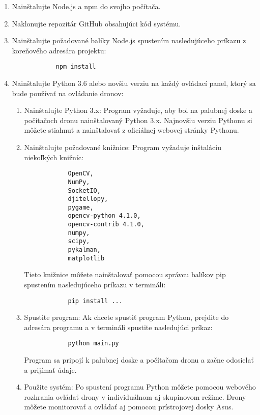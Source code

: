 \documentclass[a4paper]{feidipsp}
\begin{document}
\begin{enumerate}
    \item Nainštalujte Node.js a npm do svojho počítača.
    \item Naklonujte repozitár GitHub obsahujúci kód systému.
    \item Nainštalujte požadované balíky Node.js spustením nasledujúceho príkazu z koreňového adresára projektu:
        \begin{verbatim}
            npm install
        \end{verbatim}
    \item Nainštalujte Python 3.6 alebo novšiu verziu na každý ovládací panel, ktorý sa bude používať na ovládanie dronov:    
    \begin{enumerate}
        \item Nainštalujte Python 3.x: Program vyžaduje, aby bol na palubnej doske a počítačoch dronu nainštalovaný Python 3.x. Najnovšiu verziu Pythonu si môžete stiahnuť a nainštalovať z oficiálnej webovej stránky Pythonu.
        \item Nainštalujte požadované knižnice: Program vyžaduje inštaláciu niekoľkých knižníc:
        
        \begin{verbatim}
            OpenCV, 
            NumPy, 
            SocketIO, 
            djitellopy,
            pygame,
            opencv-python 4.1.0,
            opencv-contrib 4.1.0,
            numpy,
            scipy,
            pykalman,
            matplotlib
        \end{verbatim}

        Tieto knižnice môžete nainštalovať pomocou správcu balíkov pip spustením nasledujúceho príkazu v termináli:
        \begin{verbatim}
            pip install ...
        \end{verbatim}

        \item Spustite program: Ak chcete spustiť program Python, prejdite do adresára programu a v termináli spustite nasledujúci príkaz:        
        \begin{verbatim}
            python main.py
        \end{verbatim}
        Program sa pripojí k palubnej doske a počítačom dronu a začne odosielať a prijímať údaje.
        \item Použite systém: Po spustení programu Python môžete pomocou webového rozhrania ovládať drony v individuálnom aj skupinovom režime. Drony môžete monitorovať a ovládať aj pomocou prístrojovej dosky Asus.

    \end{enumerate}
\end{enumerate}
\end{document}
